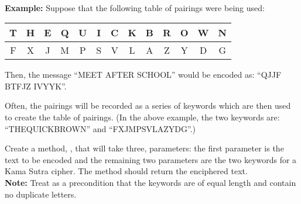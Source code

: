 \begin{questions}
    \\[4pt]
    {\small\textbf{Example:} Suppose that the following table of pairings were being used:
      \begin{center}
        \renewcommand\arraystretch{1.5}
        \begin{tabular}{| c | c | c | c | c | c | c | c | c | c | c | c | c |}
          \hline
          T & H & E & Q & U & I & C & K & B & R & O & W & N\\
          \hline
          F & X & J & M & P & S & V & L & A & Z & Y & D & G\\
          \hline
        \end{tabular}
      \end{center}
    Then, the message ``MEET AFTER SCHOOL'' would be encoded as: ``QJJF BTFJZ IVYYK''.

    Often, the pairings will be recorded as a series of keywords which are then used to create the table of pairings. (In the above example, the two keywords are: ``THEQUICKBROWN'' and ``FXJMPSVLAZYDG''.)}

    Create a method, , that will take three,  parameters: the first parameter is the text to be encoded and the remaining two parameters are the two keywords for a Kama Sutra cipher. The method should return the enciphered text.\\
    {\small\textbf{Note:} Treat as a precondition that the keywords are of equal length and contain no duplicate letters.}
  \end{questions}

